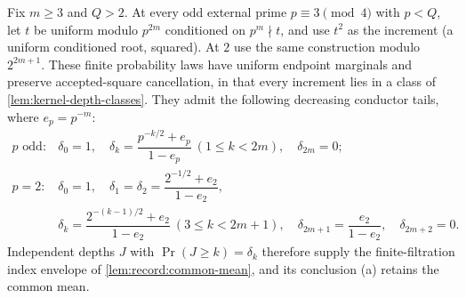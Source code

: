 \begin{lemma}
\label{lem:imp:padic-envelope}
Fix $m\ge3$ and $Q>2$. At every odd external prime
$p\equiv3\pmod4$ with $p<Q$, let $t$ be uniform modulo $p^{2m}$
conditioned on $p^m\nmid t$, and use $t^2$ as the increment (a
uniform conditioned root, squared).  At $2$ use the same
construction modulo $2^{2m+1}$.  These finite probability laws
have uniform endpoint marginals and preserve accepted-square cancellation, in that every increment lies in a class of \cref{lem:kernel-depth-classes}.  They admit the following decreasing conductor
tails, where $e_p=p^{-m}$:
\[
 \begin{array}{ll}
 p\text{ odd}:&\delta_0=1,\quad
 \delta_k=\dfrac{p^{-k/2}+e_p}{1-e_p}\ (1\le k<2m),
 \quad\delta_{2m}=0;\\[4pt]
 p=2:&\delta_0=1,\quad
 \delta_1=\delta_2=\dfrac{2^{-1/2}+e_2}{1-e_2},\\[4pt]
 &\delta_k=\dfrac{2^{-(k-1)/2}+e_2}{1-e_2}\ (3\le k<2m+1),
 \quad\delta_{2m+1}=\dfrac{e_2}{1-e_2},\quad
 \delta_{2m+2}=0.
 \end{array}
\]
Independent depths $J$ with $\Pr(J\ge k)=\delta_k$ therefore supply
the finite-filtration index envelope of \cref{lem:record:common-mean},
and its conclusion (a) retains the common mean.
\end{lemma}
